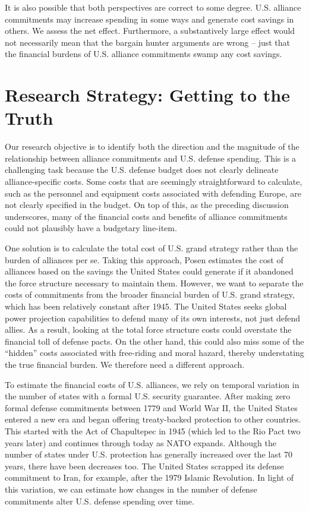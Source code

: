 It is also possible that both perspectives are correct to some degree. U.S. alliance commitments may increase spending in some ways and generate cost savings in others. We assess the net effect. Furthermore, a substantively large effect would not necessarily mean that the bargain hunter arguments are wrong -- just that the financial burdens of U.S. alliance commitments swamp any cost savings.


\section*{Research Strategy: Getting to the Truth}

Our research objective is to identify both the direction and the magnitude of the relationship between alliance commitments and U.S. defense spending. This is a challenging task because the U.S. defense budget does not clearly delineate alliance-specific costs. Some costs that are seemingly straightforward to calculate, such as the personnel and equipment costs associated with defending Europe, are not clearly specified in the budget.\autocite{posenTNI16} On top of this, as the preceding discussion underscores, many of the financial costs and benefits of alliance commitments could not plausibly have a budgetary line-item. %

One solution is to calculate the total cost of U.S. grand strategy rather than the burden of alliances per se. Taking this approach, Posen estimates the cost of alliances based on the savings the United States could generate if it abandoned the force structure necessary to maintain them.\autocite{Posen2014} However, we want to separate the costs of commitments from the broader financial burden of U.S. grand strategy, which has been relatively constant after 1945. The United States seeks global power projection capabilities to defend many of its own interests, not just defend allies. As a result, looking at the total force structure costs could overstate the financial toll of defense pacts. On the other hand, this could also miss some of the ``hidden'' costs associated with free-riding and moral hazard, thereby understating the true financial burden. We therefore need a different approach. 

To estimate the financial costs of U.S. alliances, we rely on temporal variation in the number of states with a formal U.S. security guarantee. After making zero formal defense commitments between 1779 and World War II, the United States entered a new era and began offering treaty-backed protection to other countries. This started with the Act of Chapultepec in 1945 (which led to the Rio Pact two years later) and continues through today as NATO expands. Although the number of states under U.S. protection has generally increased over the last 70 years, there have been decreases too. The United States scrapped its defense commitment to Iran, for example, after the 1979 Islamic Revolution. In light of this variation, we can estimate how changes in the number of defense commitments alter U.S. defense spending over time. 


